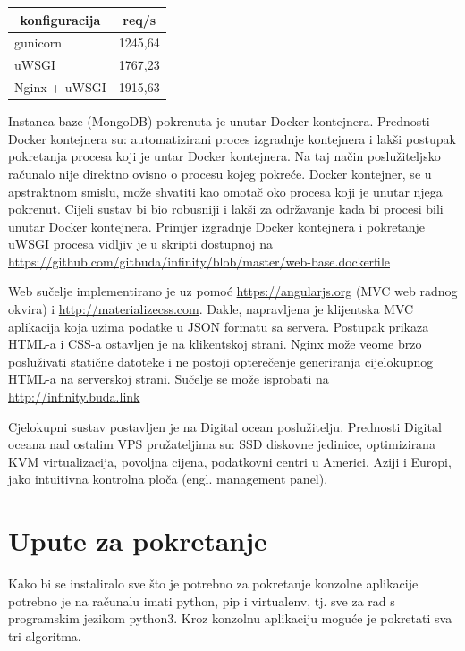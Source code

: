 \documentclass[a4paper,12pt]{article}
\begin{document}
\begin{center}
    \begin{tabular}{ | p{4cm} | p{4cm} |}
    \hline 
    \multicolumn{1}{|c|}{\textbf{konfiguracija}} & \multicolumn{1}{c|}{\textbf{req/s}} \\
    \hline gunicorn & 1245,64 \\ 
    \hline uWSGI & 1767,23 \\
    \hline Nginx + uWSGI & 1915,63 \\
    \hline
    \end{tabular}
\end{center}

\vspace{0.3cm}

Instanca baze (MongoDB) pokrenuta je unutar Docker kontejnera. Prednosti Docker kontejnera su: automatizirani proces izgradnje kontejnera i lakši postupak pokretanja procesa koji je untar Docker kontejnera. Na taj način poslužiteljsko računalo nije direktno ovisno o procesu kojeg pokreće. Docker kontejner, se  u apstraktnom smislu, može shvatiti kao omotač oko procesa koji je unutar njega pokrenut. Cijeli sustav bi bio robusniji i lakši za održavanje kada bi procesi bili unutar Docker kontejnera. Primjer izgradnje Docker kontejnera i pokretanje uWSGI procesa vidljiv je u skripti dostupnoj na \url{https://github.com/gitbuda/infinity/blob/master/web-base.dockerfile}

Web sučelje implementirano je uz pomoć \url{https://angularjs.org} (MVC web radnog okvira) i \url{http://materializecss.com}. Dakle, napravljena je klijentska MVC aplikacija koja uzima podatke u JSON formatu sa servera. Postupak prikaza HTML-a i CSS-a ostavljen je na klikentskoj strani. Nginx može veome brzo posluživati statične datoteke i ne postoji opterečenje generiranja cijelokupnog HTML-a na serverskoj strani. Sučelje se može isprobati na \url{http://infinity.buda.link}

Cjelokupni sustav postavljen je na Digital ocean poslužitelju. Prednosti Digital oceana nad ostalim VPS pružateljima su: SSD diskovne jedinice, optimizirana KVM virtualizacija, povoljna cijena, podatkovni centri u Americi, Aziji i Europi, jako intuitivna kontrolna ploča (engl. management panel).

\section{Upute za pokretanje}

Kako bi se instaliralo sve što je potrebno za pokretanje konzolne aplikacije potrebno je na računalu imati python, pip i virtualenv, tj. sve za rad s programskim jezikom python3. Kroz konzolnu aplikaciju moguće je pokretati sva tri algoritma.
\end{document}
